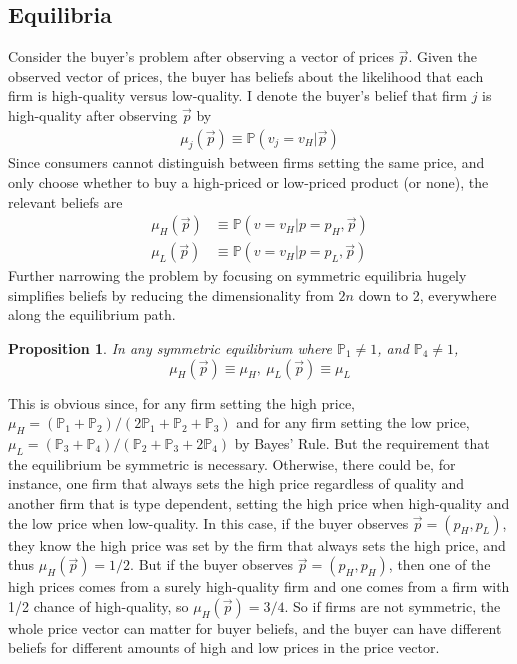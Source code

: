\documentclass[12pt]{article}
\newtheorem{proposition}{Proposition}
\begin{document}


\subsection{Equilibria}

Consider the buyer's problem after observing a vector of prices $\vec{p}$. Given the observed vector of prices, the buyer has beliefs about the likelihood that each firm is high-quality versus low-quality. I denote the buyer's belief that firm $j$ is high-quality after observing $\vec{p}$ by
\begin{align*}
\mu_j(\vec{p}) \equiv \mathbb{P}(v_j = v_H | \vec{p})
\end{align*}
Since consumers cannot distinguish between firms setting the same price, and only choose whether to buy a high-priced or low-priced product (or none), the relevant beliefs are 
\begin{align*}
\mu_H(\vec{p}) &\equiv \mathbb{P}(v = v_H | p = p_H, \vec{p}) \\
\mu_L(\vec{p}) &\equiv \mathbb{P}(v = v_H | p = p_L, \vec{p})
\end{align*}
Further narrowing the problem by focusing on symmetric equilibria hugely simplifies beliefs by reducing the dimensionality from $2n$ down to 2, everywhere along the equilibrium path.

\begin{proposition}
In any symmetric equilibrium where $\mathbb{P}_1 \neq 1$, and $\mathbb{P}_4 \neq 1$, 
\[ \mu_H(\vec{p}) \equiv \mu_H, \ \mu_L(\vec{p}) \equiv \mu_L \]
\end{proposition}

This is obvious since, for any firm setting the high price, $\mu_H = (\mathbb{P}_1 + \mathbb{P}_2)/(2\mathbb{P}_1 + \mathbb{P}_2 + \mathbb{P}_3)$ and for any firm setting the low price, $\mu_L = (\mathbb{P}_3 + \mathbb{P}_4)/(\mathbb{P}_2 + \mathbb{P}_3 + 2\mathbb{P}_4)$ by Bayes' Rule. But the requirement that the equilibrium be symmetric is necessary. Otherwise, there could be, for instance, one firm that always sets the high price regardless of quality and another firm that is type dependent, setting the high price when high-quality and the low price when low-quality. In this case, if the buyer observes $\vec{p} = (p_H, p_L)$, they know the high price was set by the firm that always sets the high price, and thus $\mu_H(\vec{p}) = 1/2$. But if the buyer observes $\vec{p} = (p_H,p_H)$, then one of the high prices comes from a surely high-quality firm and one comes from a firm with 1/2 chance of high-quality, so $\mu_H(\vec{p}) = 3/4$. So if firms are not symmetric, the whole price vector can matter for buyer beliefs, and the buyer can have different beliefs for different amounts of high and low prices in the price vector.
\end{document}
